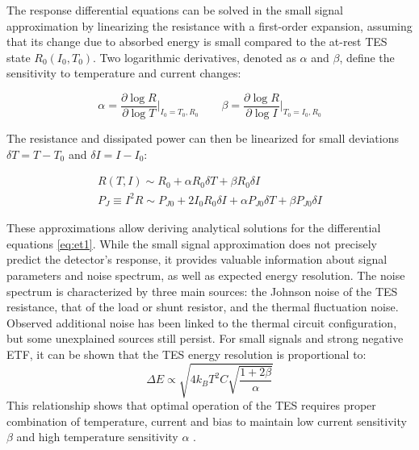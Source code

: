 The response differential equations can be solved in the small signal approximation by linearizing the resistance with a
first-order expansion, assuming that its change due to absorbed energy is small compared to
the at-rest TES state $R_0(I_0, T_0)$. Two logarithmic derivatives, denoted as $\alpha$ and $\beta$, define the sensitivity to
temperature and current changes:

\begin{equation}
\alpha = \frac{\partial \log R}{\partial \log T}\Bigg|_{I_0=T_0,R_0} \quad  \quad \beta = \frac{\partial \log R}{\partial \log I}\Bigg|_{T_0=I_0,R_0}
\end{equation}

The resistance and dissipated power can then be linearized for small deviations $\delta T = T - T_0$ and $\delta I =
I - I_0$:

\begin{eqnarray}
R(T, I) \sim R_0 + \alpha R_0 \delta T + \beta R_0 \delta I\\
P_J \equiv I^2R \sim P_{J0} + 2I_0R_0\delta I + \alpha P_{J0}\delta T + \beta P_{J0}\delta I
\end{eqnarray}

These approximations allow deriving analytical solutions for the differential equations \ref{eq:et1}. While the small signal approximation does not precisely predict the detector's response, it provides valuable information about signal parameters and noise spectrum, as well as expected energy resolution.
The noise spectrum is characterized by three main sources: the Johnson noise of the TES resistance, that of the load or
shunt resistor, and the thermal fluctuation noise. Observed additional noise has been linked to the thermal circuit
configuration, but some unexplained sources still persist.
For small signals and strong negative ETF, it can be shown that the TES energy resolution is proportional to:
\begin{equation}
  \Delta E\propto \sqrt{{4k_B T^2 C}{\sqrt{\frac{1+2\beta}{\alpha}}}}
\end{equation}
This relationship shows that optimal operation of the TES requires proper combination of temperature, current and bias
to maintain low current sensitivity $\beta$ and high temperature sensitivity $\alpha$ \cite{zhou2020towards}. 


